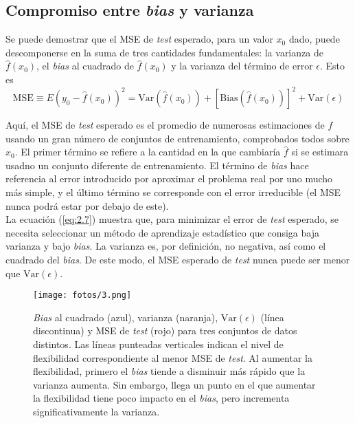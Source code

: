 \subsection{Compromiso entre \textit{bias} y varianza}

Se puede demostrar que el MSE de \textit{test} esperado, para un valor $x_0$ dado, puede descomponerse en la suma de tres cantidades fundamentales: la varianza de $\hat{f}(x_0)$, el \textit{bias} al cuadrado de $\hat{f}(x_0)$ y la varianza del término de error $\epsilon$. Esto es 
\begin{equation}
\text{MSE} \equiv E(y_0 - \hat{f}(x_0))^2 = \text{Var}(\hat{f}(x_0)) + [\text{Bias}(\hat{f}(x_0))]^2 + \text{Var}(\epsilon)
\label{eq:2.7}
\end{equation}

Aquí, el MSE de \textit{test} esperado es el promedio de numerosas estimaciones de $f$ usando un gran número de conjuntos de entrenamiento, comprobados todos sobre $x_0$. El primer término se refiere a la cantidad en la que cambiaría $\hat{f}$ si se estimara usadno un conjunto diferente de entrenamiento. El término de \textit{bias} hace referencia al error introducido por aproximar el problema real por uno mucho más simple, y el último término se corresponde con el error irreducible (el MSE nunca podrá estar por debajo de este). \\

La ecuación (\ref{eq:2.7}) muestra que, para minimizar el error de \textit{test} esperado, se necesita seleccionar un método de aprendizaje estadístico que consiga baja varianza y bajo \textit{bias}. La varianza es, por definición, no negativa, así como el cuadrado del \textit{bias}. De este modo, el MSE esperado de \textit{test} nunca puede ser menor que $\text{Var}(\epsilon)$. \\

\begin{figure}[h]
\centering
\texttt{[image: fotos/3.png]}
\caption{\textit{Bias} al cuadrado (azul), varianza (naranja), $\text{Var}(\epsilon)$ (línea discontinua) y MSE de \textit{test} (rojo) para tres conjuntos de datos distintos. Las líneas punteadas verticales indican el nivel de flexibilidad correspondiente al menor MSE de \textit{test}. Al aumentar la flexibilidad, primero el \textit{bias} tiende a disminuir más rápido que la varianza aumenta. Sin embargo, llega un punto en el que aumentar la flexibilidad tiene poco impacto en el \textit{bias}, pero incrementa significativamente la varianza.}
\label{fig:3}
\end{figure}

